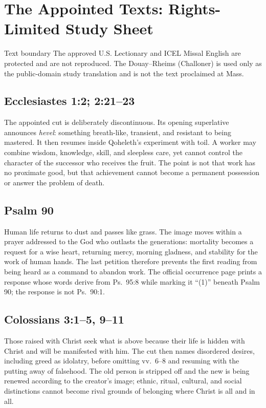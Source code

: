 \section*{The Appointed Texts: Rights-Limited Study Sheet}
\begin{studybox}{Text boundary}
The approved U.S. Lectionary and ICEL Missal English are protected and are not
reproduced. The Douay--Rheims (Challoner) is used only as the public-domain
study translation and is not the text proclaimed at Mass.
\end{studybox}
\subsection*{Ecclesiastes 1:2; 2:21--23}
The appointed cut is deliberately discontinuous. Its opening superlative
announces \emph{hevel}: something breath-like, transient, and resistant to
being mastered. It then resumes inside Qoheleth's experiment with toil. A
worker may combine wisdom, knowledge, skill, and sleepless care, yet cannot
control the character of the successor who receives the fruit. The point is
not that work has no proximate good, but that achievement cannot become a
permanent possession or answer the problem of death.
\subsection*{Psalm 90}
Human life returns to dust and passes like grass. The image moves within a
prayer addressed to the God who outlasts the generations: mortality becomes a
request for a wise heart, returning mercy, morning gladness, and stability for
the work of human hands. The last petition therefore prevents the first
reading from being heard as a command to abandon work.
The official occurrence page prints a response whose words derive from
Ps.~95:8 while marking it ``(1)'' beneath Psalm 90; the response is not
Ps.~90:1.
\subsection*{Colossians 3:1--5, 9--11}
Those raised with Christ seek what is above because their life is hidden with
Christ and will be manifested with him. The cut then names disordered desires,
including greed as idolatry, before omitting vv.~6--8 and resuming with the
putting away of falsehood. The old person is stripped off and the new is being
renewed according to the creator's image; ethnic, ritual, cultural, and social
distinctions cannot become rival grounds of belonging where Christ is all and
in all.
